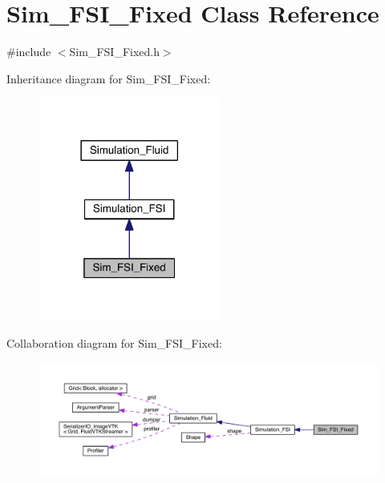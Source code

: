 \hypertarget{class_sim___f_s_i___fixed}{}\section{Sim\+\_\+\+F\+S\+I\+\_\+\+Fixed Class Reference}
\label{class_sim___f_s_i___fixed}


{\ttfamily \#include $<$Sim\+\_\+\+F\+S\+I\+\_\+\+Fixed.\+h$>$}



Inheritance diagram for Sim\+\_\+\+F\+S\+I\+\_\+\+Fixed\+:\nopagebreak
\begin{figure}[H]
\begin{center}
\leavevmode
\includegraphics[width=170pt]{da/d05/class_sim___f_s_i___fixed__inherit__graph}
\end{center}
\end{figure}


Collaboration diagram for Sim\+\_\+\+F\+S\+I\+\_\+\+Fixed\+:\nopagebreak
\begin{figure}[H]
\begin{center}
\leavevmode
\includegraphics[width=350pt]{dc/d0c/class_sim___f_s_i___fixed__coll__graph}
\end{center}
\end{figure}
